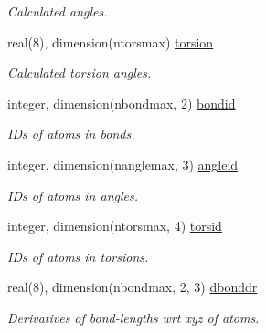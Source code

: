 \begin{DoxyCompactItemize}
\begin{DoxyCompactList}\small\item\em Calculated angles. \end{DoxyCompactList}\item 
\mbox{\label{structchemstr_1_1cxs_aba4f0e6140285d4cb94c8d8c8b33ca0f}} 
real(8), dimension(ntorsmax) \mbox{\hyperlink{structchemstr_1_1cxs_aba4f0e6140285d4cb94c8d8c8b33ca0f}{torsion}}
\begin{DoxyCompactList}\small\item\em Calculated torsion angles. \end{DoxyCompactList}\item 
\mbox{\label{structchemstr_1_1cxs_a286848a0567b25036fff68f6d3e21539}} 
integer, dimension(nbondmax, 2) \mbox{\hyperlink{structchemstr_1_1cxs_a286848a0567b25036fff68f6d3e21539}{bondid}}
\begin{DoxyCompactList}\small\item\em I\+Ds of atoms in bonds. \end{DoxyCompactList}\item 
\mbox{\label{structchemstr_1_1cxs_a8636a73dec884f53d15bf57f09fd8df1}} 
integer, dimension(nanglemax, 3) \mbox{\hyperlink{structchemstr_1_1cxs_a8636a73dec884f53d15bf57f09fd8df1}{angleid}}
\begin{DoxyCompactList}\small\item\em I\+Ds of atoms in angles. \end{DoxyCompactList}\item 
\mbox{\label{structchemstr_1_1cxs_abee0ddcd6430f88aa24f54860893b7ca}} 
integer, dimension(ntorsmax, 4) \mbox{\hyperlink{structchemstr_1_1cxs_abee0ddcd6430f88aa24f54860893b7ca}{torsid}}
\begin{DoxyCompactList}\small\item\em I\+Ds of atoms in torsions. \end{DoxyCompactList}\item 
\mbox{\label{structchemstr_1_1cxs_a0577665bbd708dfa7ac5d18464a2d2fb}} 
real(8), dimension(nbondmax, 2, 3) \mbox{\hyperlink{structchemstr_1_1cxs_a0577665bbd708dfa7ac5d18464a2d2fb}{dbonddr}}
\begin{DoxyCompactList}\small\item\em Derivatives of bond-\/lengths wrt xyz of atoms. \end{DoxyCompactList}\item 

\end{DoxyCompactItemize}
